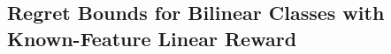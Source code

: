 


\iffalse
\subsection{Regret Bounds for Bilinear Classes with Known-Feature Linear Reward}\label{sec: hybrid bilinear}






